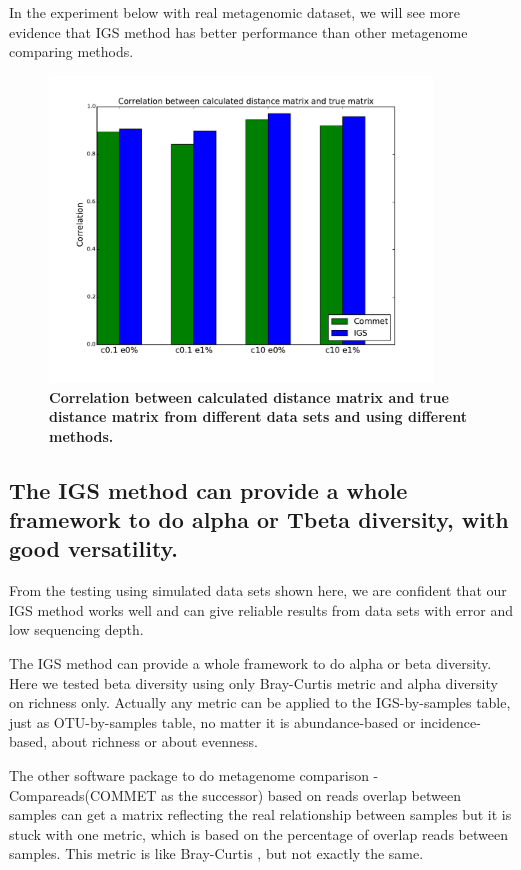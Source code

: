 In the experiment below with real metagenomic dataset, we will see more evidence
that IGS method has better performance than other metagenome comparing methods.

\begin{figure}[!ht]
 \centerline{\includegraphics[width=4in]{./figures/compare_commet.pdf}}
\caption{\bf Correlation between calculated distance matrix and true distance matrix
from different data sets and using different methods.}
\label{fig:compare_commet}
\end{figure}

\subsection{The IGS method can provide a whole framework to do alpha or 
Tbeta diversity, with good versatility.}

From the testing using simulated data sets shown here, we are confident that 
our IGS method works well and can give reliable results from data sets with 
error and low sequencing depth.

The IGS method can provide a whole framework to do alpha or beta diversity. 
Here we tested beta diversity using only Bray-Curtis metric and alpha 
diversity on richness only. Actually any metric can be applied to the 
IGS-by-samples table, just as OTU-by-samples table, 
no matter it is abundance-based or incidence-based, about richness or about 
evenness.

The other software package to do metagenome comparison - Compareads(COMMET as
the successor) 
based on reads overlap between samples can get a matrix 
reflecting the real relationship between samples but it is stuck with one 
metric, which is based on the percentage of overlap reads between samples. 
This metric is like Bray-Curtis , but not exactly the same.


